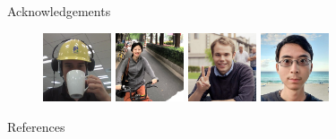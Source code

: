 \documentclass[mathserif,notheorems, hyperref={colorlinks, urlcolor=blue, linkcolor=blue}]{beamer}
\begin{document}
\begin{frame}{Acknowledgements}
\begin{figure}
            \vspace{0.4ex}%

            \includegraphics[width=0.18\textwidth]{collaborators/fred}
            \includegraphics[width=0.18\textwidth]{collaborators/cathy}
            \includegraphics[width=0.18\textwidth]{collaborators/wilder}
            \includegraphics[width=0.18\textwidth]{collaborators/joey}
        \end{figure}

    \end{frame}

    \begin{frame}[allowframebreaks]{References}
        
        
    \end{frame}
\end{document}
